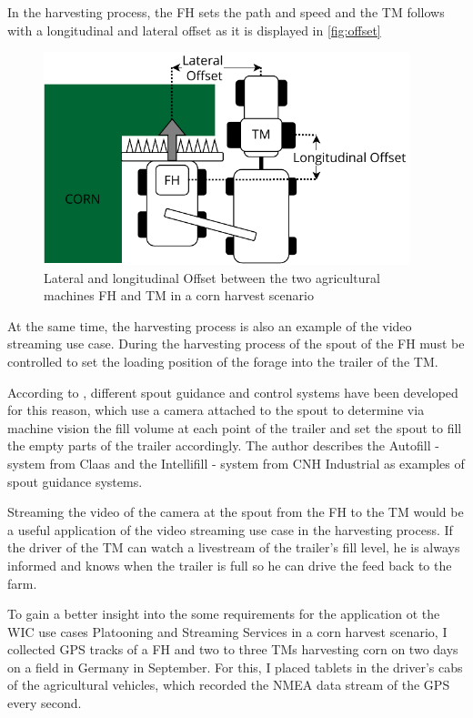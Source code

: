 \documentclass[]{nsm-thesis}
\begin{document}
In the harvesting process, the \ac{FH} sets the path and speed and the \ac{TM} follows with a longitudinal and lateral offset as it is displayed in \autoref{fig:offset}
\begin{figure}%
	\centering
	\includegraphics[width=0.95\textwidth]{figures/offset_platoon.pdf}
	\caption{Lateral and longitudinal Offset between the two agricultural machines \ac{FH} and \ac{TM} in a corn harvest scenario}%
	\label{fig:offset}%
\end{figure}

At the same time, the harvesting process is also an example of the video streaming use case. During the harvesting process of the spout of the \ac{FH} must be controlled to set the loading position of the forage into the trailer of the \ac{TM}.

According to \textcite{HMThesis}, different spout guidance and control systems have been developed for this reason, which use a camera attached to the spout to determine via machine vision the fill volume at each point of the trailer and set the spout to fill the empty parts of the trailer accordingly. The author describes the Autofill -  system from Claas and the Intellifill - system from CNH Industrial as examples of spout guidance systems. 

Streaming the video of the camera at the spout from the \ac{FH} to the \ac{TM} would be a useful application of the video streaming use case in the harvesting process. If the driver of the \ac{TM} can watch a livestream of the trailer's fill level, he is always informed and knows when the trailer is full so he can drive the feed back to the farm.

To gain a better insight into the some requirements for the application ot the \ac{WIC} use cases Platooning and Streaming Services in a corn harvest scenario, I collected GPS tracks of a \ac{FH} and two to three \ac{TM}s harvesting corn on two days on a field in Germany in September. For this, I placed tablets in the driver's cabs of the agricultural vehicles, which recorded the NMEA data stream of the GPS every second. 
\end{document}
